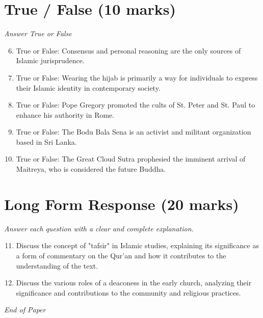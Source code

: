 \documentclass[12pt]{article}
\begin{document}
\section*{True / False (10 marks)}
\textit{Answer True or False}
\begin{enumerate}[label=\arabic*.]
\setcounter{enumi}{5}
\item True or False: Consensus and personal reasoning are the only sources of Islamic jurisprudence.
\item True or False: Wearing the hijab is primarily a way for individuals to express their Islamic identity in contemporary society.
\item True or False: Pope Gregory promoted the cults of St. Peter and St. Paul to enhance his authority in Rome.
\item True or False: The Bodu Bala Sena is an activist and militant organization based in Sri Lanka.
\item True or False: The Great Cloud Sutra prophesied the imminent arrival of Maitreya, who is considered the future Buddha.
\end{enumerate}

\section*{Long Form Response (20 marks)}
\textit{Answer each question with a clear and complete explanation.}
\begin{enumerate}[label=\arabic*.]
\setcounter{enumi}{10}
\item Discuss the concept of "tafsir" in Islamic studies, explaining its significance as a form of commentary on the Qur'an and how it contributes to the understanding of the text.
\item Discuss the various roles of a deaconess in the early church, analyzing their significance and contributions to the community and religious practices.
\end{enumerate}

\vfill
\noindent\textit{End of Paper}
\end{document}

